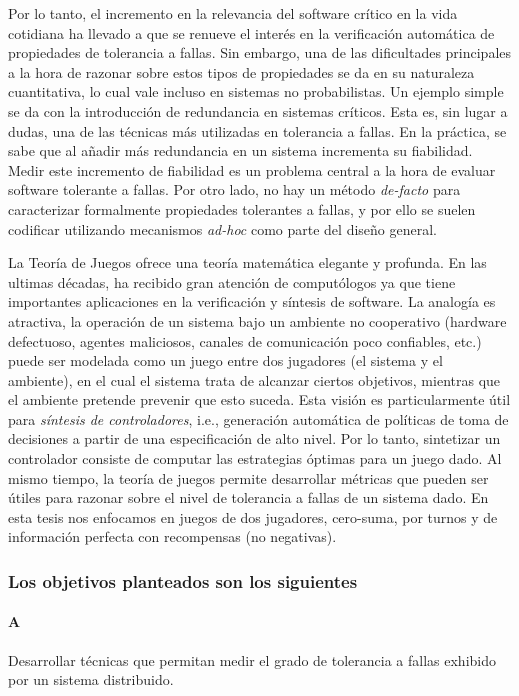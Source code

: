 Por lo tanto, el incremento en la relevancia del software crítico en la vida cotidiana ha llevado a que se renueve el interés en la verificación automática de propiedades de tolerancia a fallas. Sin embargo, una de las dificultades principales a la hora de razonar sobre estos tipos de propiedades se da en su naturaleza cuantitativa, lo cual vale incluso en sistemas no probabilistas.
Un ejemplo simple se da con la introducción de redundancia en sistemas críticos. Esta es, sin lugar a dudas, una de las técnicas más utilizadas en tolerancia a fallas.
En la práctica, se sabe que al añadir más redundancia en un sistema incrementa su fiabilidad. Medir este incremento de fiabilidad es un problema central a la hora de evaluar software tolerante a fallas. Por otro lado, no hay un método \emph{de-facto} para caracterizar formalmente propiedades tolerantes a fallas, y por ello se suelen codificar utilizando mecanismos \emph{ad-hoc} como parte del diseño general.

La Teoría de Juegos \cite{MorgensternNeuman42} ofrece una teoría matemática elegante y profunda. 
En las ultimas décadas, ha recibido gran atención de computólogos ya que tiene importantes aplicaciones en la verificación y síntesis de software. 
La analogía es atractiva, la operación de un sistema bajo un ambiente no cooperativo (hardware defectuoso, agentes maliciosos, canales de comunicación poco confiables, etc.) puede ser modelada como un juego entre dos jugadores (el sistema y el ambiente), en el cual el sistema trata de alcanzar ciertos objetivos, mientras que el ambiente pretende prevenir que esto suceda. 
Esta visión es particularmente útil para \emph{síntesis de controladores}, i.e., generación automática de políticas de toma de decisiones a partir de una especificación de alto nivel. 
Por lo tanto, sintetizar un controlador consiste de computar las estrategias óptimas para un juego dado. Al mismo tiempo, la teoría de juegos permite desarrollar métricas que pueden ser útiles para razonar sobre el nivel de tolerancia a fallas de un sistema dado.
En esta tesis nos enfocamos en juegos de dos jugadores, cero-suma, por turnos y de información perfecta con recompensas (no negativas)\cite{FilarV96}. 

\subsubsection*{Los objetivos planteados son los siguientes}

\paragraph{A}
Desarrollar técnicas que permitan medir el grado de tolerancia a fallas exhibido por un sistema distribuido.

